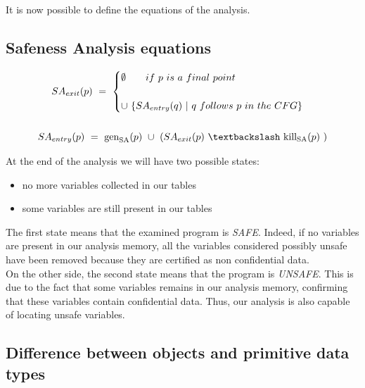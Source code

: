 \documentclass[letterpaper,twocolumn,10pt]{article}
\begin{document}
It is now possible to define the equations of the analysis.
\subsection{Safeness Analysis equations}
\begin{gather*}
SA_\textrm{$exit$}(p)\ =\ 
\begin{cases}
\emptyset\qquad if\ p\ is\ a\ final\ point\ \\ \\
\cup\ \lbrace SA_\textrm{$entry$}(q)\ |\ q\ follows\ p\ in\ the\ CFG \rbrace 
\end{cases} \\ \\
SA_\textrm{$entry$}(p)\ =\ \text{gen}_\textrm{SA}(p)\ \cup\ (SA_\textrm{$exit$}(p)\ \textbackslash\ \text{kill}_\textrm{SA}(p)\ )
\end{gather*}

At the end of the analysis we will have two possible states:
\begin{itemize}
\item no more variables collected in our tables
\item some variables are still present in our tables
\end{itemize}
The first state means that the examined program is \emph{SAFE}. Indeed, if no variables are present in our analysis memory, all the variables considered possibly unsafe have been removed because they are certified as non confidential data.\\
On the other side, the second state means that the program is \emph{UNSAFE}. This is due to the fact that some variables remains in our analysis memory, confirming that these variables contain confidential data. Thus, our analysis is also capable of locating unsafe variables.

\subsection{Difference between objects and primitive data types}
\end{document}
